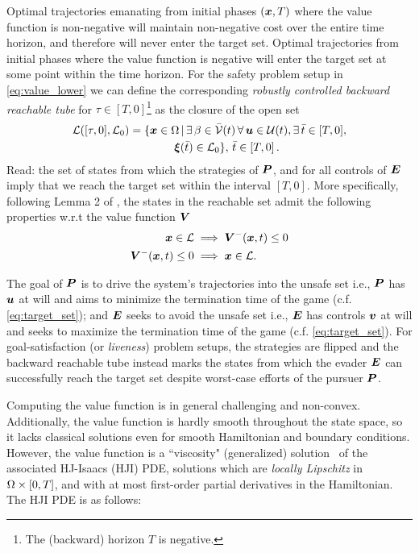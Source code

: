 Optimal trajectories emanating from initial phases $(\bm{x},T)$ where the value function is non-negative will maintain non-negative cost over the entire time horizon, and therefore will never enter the target set. Optimal trajectories from initial phases where the value function is negative will enter the target set at some point within the time horizon.  For the safety problem setup in \eqref{eq:value_lower} we can define the corresponding \textit{robustly controlled backward reachable tube} for $\tau \in [T, 0]$\footnote{The (backward) horizon $T$ is negative.} as the closure of the open set
%
\begin{align}
	\mathcal{L}([\tau, 0], \mathcal{L}_0) &= \{\state \in \openset \,| \, \exists \, \beta \in \mathcal{\bar{V}}(t) \,  \forall \, \bm{u} \in \mathcal{U}(t), \exists \, \bar{t} \in [T, 0], \nonumber \\
	& \qquad  \qquad \bm{\xi}(\bar{t})%
	\in  \mathcal{L}_0 \}, \,\bar{t} \in \left[T, 0\right].
	\label{eq:rcbrt}
\end{align}
%
Read: the set of states from which the strategies of $\bm{P}$, and for all controls of $\bm{E}$ imply that we reach the target set within the interval $[T, 0]$.   More specifically, following Lemma 2 of \citet{Mitchell2005}, the states in the reachable set admit the following properties w.r.t the value function $\bm{V}$
%
\begin{subequations}
	\begin{align}
		\bm{x} \in \mathcal{L} &\implies \bm{V}^-(\bm{x}, t) \le 0 \\
		\bm{V}^-(\bm{x}, t) \le 0 &\implies \bm{x} \in \mathcal{L}.
	\end{align}
\end{subequations}

The goal of  $\bm{P}$ is to drive the system's trajectories into the unsafe set i.e., $\bm{P}$ has $\bm{u}$ at will and aims to minimize the termination time of the game  (c.f. \eqref{eq:target_set}); and  $\bm{E}$ seeks to avoid the unsafe  set i.e., $\bm{E}$ has controls $\bm{v}$ at will and seeks to maximize the termination time of the game (c.f.  \eqref{eq:target_set}). For goal-satisfaction (or \textit{liveness}) problem setups, the strategies are flipped and the backward reachable tube instead marks the states from which the evader $\bm{E}$ can successfully reach the target set despite worst-case efforts of the pursuer $\bm{P}$.

Computing the value function is in general challenging and non-convex. Additionally, the value function is hardly smooth throughout the state space, so it lacks classical solutions even for smooth Hamiltonian and boundary conditions. However, the value function is a ``viscosity" (generalized)  solution~\citet{Lions1982, Crandall1983viscosity} of the associated HJ-Isaacs (HJI) PDE, \ie solutions which are \textit{locally Lipschitz} in $\Omega \times [0, T]$, and with at most first-order partial derivatives in the Hamiltonian.  The HJI PDE is as follows:

